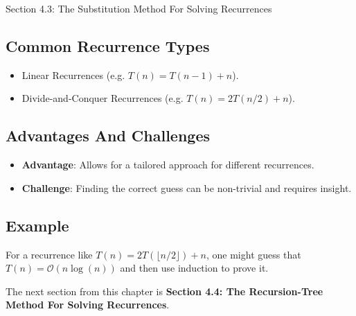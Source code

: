 \begin{notes}{Section 4.3: The Substitution Method For Solving Recurrences}
    \subsection*{Common Recurrence Types}

    \begin{itemize}
        \item Linear Recurrences (e.g. $T(n) = T(n - 1) + n$).
        \item Divide-and-Conquer Recurrences (e.g. $T(n) = 2T(n / 2) + n$).
    \end{itemize}

    \subsection*{Advantages And Challenges}

    \begin{itemize}
        \item \textbf{Advantage}: Allows for a tailored approach for different recurrences.
        \item \textbf{Challenge}: Finding the correct guess can be non-trivial and requires insight.
    \end{itemize}

    \subsection*{Example}

    For a recurrence like $T(n) = 2T(\lfloor n / 2 \rfloor) + n$, one might guess that $T(n) = \mathcal{O}(n \log{(n)})$ and then use induction to prove it.
\end{notes}

The next section from this chapter is \textbf{Section 4.4: The Recursion-Tree Method For Solving Recurrences}.

